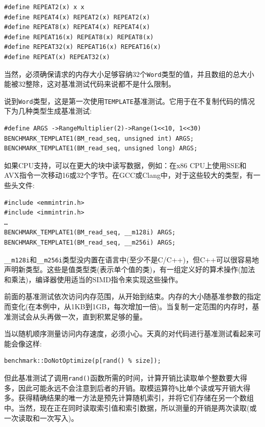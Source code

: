 \begin{lstlisting}[style=styleCXX]
#define REPEAT2(x) x x
#define REPEAT4(x) REPEAT2(x) REPEAT2(x)
#define REPEAT8(x) REPEAT4(x) REPEAT4(x)
#define REPEAT16(x) REPEAT8(x) REPEAT8(x)
#define REPEAT32(x) REPEAT16(x) REPEAT16(x)
#define REPEAT(x) REPEAT32(x)
\end{lstlisting}

当然，必须确保请求的内存大小足够容纳32个\texttt{Word}类型的值，并且数组的总大小能被32整除，这对基准测试代码来说都不是什么限制。

说到\texttt{Word}类型，这是第一次使用\texttt{TEMPLATE}基准测试。它用于在不复制代码的情况下为几种类型生成基准测试:

\begin{lstlisting}[style=styleCXX]
#define ARGS ->RangeMultiplier(2)->Range(1<<10, 1<<30)
BENCHMARK_TEMPLATE1(BM_read_seq, unsigned int) ARGS;
BENCHMARK_TEMPLATE1(BM_read_seq, unsigned long) ARGS;
\end{lstlisting}

如果CPU支持，可以在更大的块中读写数据，例如：在x86 CPU上使用SSE和AVX指令一次移动16或32个字节。在GCC或Clang中，对于这些较大的类型，有一些头文件:

\begin{lstlisting}[style=styleCXX]
#include <emmintrin.h>
#include <immintrin.h>
…
BENCHMARK_TEMPLATE1(BM_read_seq, __m128i) ARGS;
BENCHMARK_TEMPLATE1(BM_read_seq, __m256i) ARGS;
\end{lstlisting}

\texttt{\_\_m128i}和\texttt{\_\_m256i}类型没内置在语言中(至少不是C/C++)，但C++可以很容易地声明新类型。这些是值类型类(表示单个值的类)，有一组定义好的算术操作(加法和乘法)，编译器使用适当的SIMD指令来实现这些操作。

前面的基准测试依次访问内存范围，从开始到结束。内存的大小随基准参数的指定而变化(在本例中，从1KB到1GB，每次增加一倍)。当复制一定范围的内存时，基准测试会从头再做一次，直到积累足够的量。

当以随机顺序测量访问内存速度，必须小心。天真的对代码进行基准测试看起来可能会像这样:

\begin{lstlisting}[style=styleCXX]
benchmark::DoNotOptimize(p[rand() % size]);
\end{lstlisting}

但此基准测试了调用\texttt{rand()}函数所需的时间，计算开销比读取单个整数要大得多，因此可能永远不会注意到后者的开销。取模运算符\texttt{\%}比单个读或写开销大得多。获得精确结果的唯一方法是预先计算随机索引，并将它们存储在另一个数组中。当然，现在正在同时读取索引值和索引数据，所以测量的开销是两次读取(或一次读取和一次写入)。

